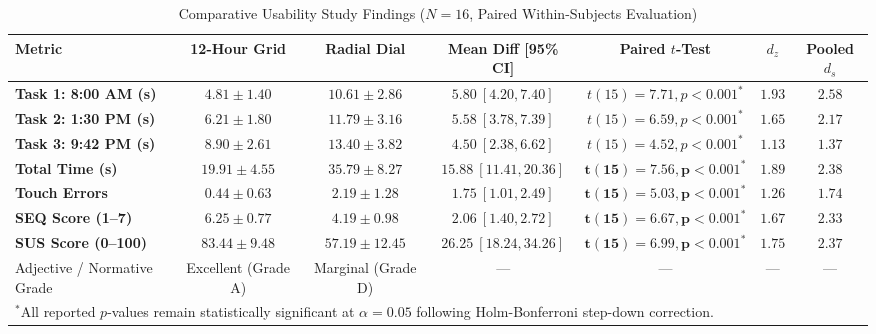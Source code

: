 \documentclass[11pt,a4paper]{article}
\begin{document}
\begin{table}[t]
\centering
\small
\caption{Comparative Usability Study Findings ($N=16$, Paired Within-Subjects Evaluation)}
\label{tab:usability_results}
\begin{tabularx}{\textwidth}{lcccccc}
\toprule
\textbf{Metric} & \textbf{12-Hour Grid} & \textbf{Radial Dial} & \textbf{Mean Diff [95\% CI]} & \textbf{Paired $t$-Test} & \textbf{$d_z$} & \textbf{Pooled $d_s$} \\
\midrule
\textbf{Task 1: 8:00 AM (s)} & $4.81 \pm 1.40$ & $10.61 \pm 2.86$ & $5.80\ [4.20, 7.40]$ & $t(15) = 7.71, p < 0.001^*$ & $1.93$ & $2.58$ \\
\textbf{Task 2: 1:30 PM (s)} & $6.21 \pm 1.80$ & $11.79 \pm 3.16$ & $5.58\ [3.78, 7.39]$ & $t(15) = 6.59, p < 0.001^*$ & $1.65$ & $2.17$ \\
\textbf{Task 3: 9:42 PM (s)} & $8.90 \pm 2.61$ & $13.40 \pm 3.82$ & $4.50\ [2.38, 6.62]$ & $t(15) = 4.52, p < 0.001^*$ & $1.13$ & $1.37$ \\
\midrule
\textbf{Total Time (s)} & $\mathbf{19.91 \pm 4.55}$ & $\mathbf{35.79 \pm 8.27}$ & $\mathbf{15.88\ [11.41, 20.36]}$ & $\mathbf{t(15) = 7.56, p < 0.001^*}$ & $\mathbf{1.89}$ & $\mathbf{2.38}$ \\
\textbf{Touch Errors} & $\mathbf{0.44 \pm 0.63}$ & $\mathbf{2.19 \pm 1.28}$ & $\mathbf{1.75\ [1.01, 2.49]}$ & $\mathbf{t(15) = 5.03, p < 0.001^*}$ & $\mathbf{1.26}$ & $\mathbf{1.74}$ \\
\textbf{SEQ Score (1--7)} & $\mathbf{6.25 \pm 0.77}$ & $\mathbf{4.19 \pm 0.98}$ & $\mathbf{2.06\ [1.40, 2.72]}$ & $\mathbf{t(15) = 6.67, p < 0.001^*}$ & $\mathbf{1.67}$ & $\mathbf{2.33}$ \\
\midrule
\textbf{SUS Score (0--100)} & $\mathbf{83.44 \pm 9.48}$ & $\mathbf{57.19 \pm 12.45}$ & $\mathbf{26.25\ [18.24, 34.26]}$ & $\mathbf{t(15) = 6.99, p < 0.001^*}$ & $\mathbf{1.75}$ & $\mathbf{2.37}$ \\
Adjective / Normative Grade & Excellent (Grade A) & Marginal (Grade D) & --- & --- & --- & --- \\
\bottomrule
\multicolumn{7}{l}{\footnotesize $^*$All reported $p$-values remain statistically significant at $\alpha = 0.05$ following Holm-Bonferroni step-down correction.}
\end{tabularx}
\end{table}
\end{document}
